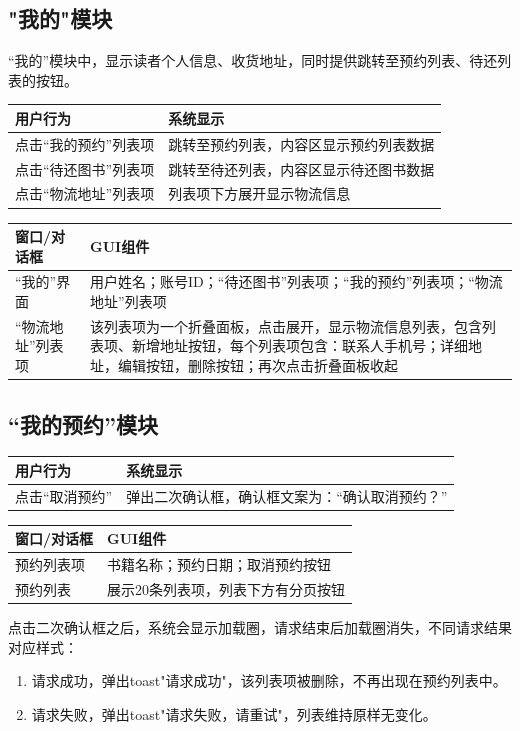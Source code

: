 \subsection{"我的"模块}
“我的”模块中，显示读者个人信息、收货地址，同时提供跳转至预约列表、待还列表的按钮。
\begin{table}[ht]
    \centering
    \begin{tabular*}{\textwidth}{p{}p{}}
        \hline
        用户行为 & 系统显示\\
        \hline
        点击“我的预约”列表项 & 跳转至预约列表，内容区显示预约列表数据\\
        点击“待还图书”列表项 & 跳转至待还列表，内容区显示待还图书数据 \\
        点击“物流地址”列表项& 列表项下方展开显示物流信息 \\
        \hline
    \end{tabular*}
    \begin{tabular*}{\textwidth}{p{}p{}}
        \hline
        窗口/对话框  & GUI组件 \\
        \hline
        “我的”界面 & 用户姓名；账号ID；“待还图书”列表项；“我的预约”列表项；“物流地址”列表项\\
        “物流地址”列表项 & 该列表项为一个折叠面板，点击展开，显示物流信息列表，包含列表项、新增地址按钮，每个列表项包含：联系人手机号；详细地址，编辑按钮，删除按钮；再次点击折叠面板收起 \\
        \hline
    \end{tabular*}
\end{table}
\newpage
\subsection{“我的预约”模块}
\begin{table}[ht]
    \centering
    \begin{tabular*}{\textwidth}{p{}p{}}
        \hline
        用户行为 & 系统显示\\
        \hline
        点击“取消预约” & 弹出二次确认框，确认框文案为：“确认取消预约？”\\
        \hline
    \end{tabular*}
    \begin{tabular*}{\textwidth}{p{}p{}}
        \hline
        窗口/对话框  & GUI组件 \\
        \hline
        预约列表项 & 书籍名称；预约日期；取消预约按钮\\
        预约列表 & 展示20条列表项，列表下方有分页按钮\\
        \hline
    \end{tabular*}
\end{table}
点击二次确认框之后，系统会显示加载圈，请求结束后加载圈消失，不同请求结果对应样式：
\begin{enumerate}
   \item 请求成功，弹出toast"请求成功"，该列表项被删除，不再出现在预约列表中。
   \item 请求失败，弹出toast"请求失败，请重试"，列表维持原样无变化。 
\end{enumerate}

